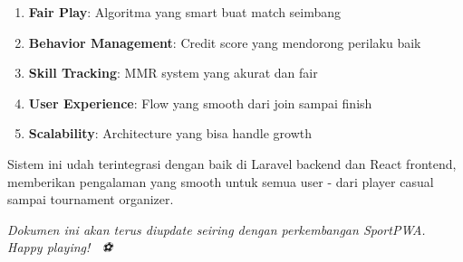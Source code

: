 \documentclass[12pt]{article}
\begin{document}
\begin{enumerate}
    \item \textbf{Fair Play}: Algoritma yang smart buat match seimbang
    \item \textbf{Behavior Management}: Credit score yang mendorong perilaku baik
    \item \textbf{Skill Tracking}: MMR system yang akurat dan fair
    \item \textbf{User Experience}: Flow yang smooth dari join sampai finish
    \item \textbf{Scalability}: Architecture yang bisa handle growth
\end{enumerate}

Sistem ini udah terintegrasi dengan baik di Laravel backend dan React frontend, memberikan pengalaman yang smooth untuk semua user - dari player casual sampai tournament organizer.

\vspace{1cm}

\textit{Dokumen ini akan terus diupdate seiring dengan perkembangan SportPWA. Happy playing! 🏸🎾⚽}
\end{document}
